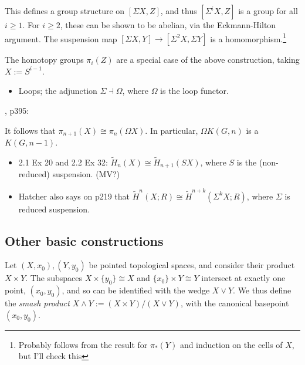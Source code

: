 \documentclass{MetricNotes2023}
\begin{document}
\begin{remark}\label{2504091052}
This defines a group structure on \([\Sigma X, Z]\), and thus \([\Sigma^i X, Z]\) is a group for all \(i\geq 1\). For \(i\geq 2\), these can be shown to be abelian, via the Eckmann-Hilton argument. The suspension map \([\Sigma X, Y]\to [\Sigma^2X, \Sigma Y]\) is a homomorphism.\footnote{Probably follows from the result for \(\pi_*(Y)\) and induction on the cells of \(X\), but I'll check this}
\end{remark}

\begin{remark}\label{2502200937}
The homotopy groups \(\pi_i(Z)\) are a special case of the above construction, taking \(X:=S^{i-1}\). 
\end{remark}


\begin{itemize}
\item Loops; the adjunction \(\Sigma \dashv \Omega\), where \(\Omega\) is the loop functor.
\end{itemize}

\autocite{hatcher}, p395:

\begin{remark}
It follows that \(\pi_{n+1}(X)\cong \pi_n(\Omega X)\). In particular, \(\Omega K(G, n)\) is a \newline\(K(G, n-1)\). 
\end{remark}

\begin{itemize}
\item \autocite{hatcher} 2.1 Ex 20 and 2.2 Ex 32: \(\widetilde H_n(X)\cong \widetilde H_{n+1}(SX)\), where \(S\) is the (non-reduced) suspension.  (MV?) 
\item Hatcher also says on p219 that \(\widetilde H^n(X;R)\cong \widetilde H^{n+k}(\Sigma^kX;R)\), where \(\Sigma \) is reduced suspension.
\end{itemize}

\subsection{Other basic constructions}

\begin{definition}
Let \((X, x_0), (Y, y_0)\) be pointed topological spaces, and consider their product \(X\times Y\). The subspaces \(X\times\{y_0\}\cong X\) and \(\{x_0\}\times Y\cong Y\) intersect at exactly one point, \((x_0, y_0)\), and so can be identified with the wedge \(X\vee Y\). We thus define the \textit{smash product} \(X\wedge Y:=(X\times Y)/(X\vee Y)\), with the canonical basepoint \((x_0,y_0)\).  
\end{definition}
\end{document}
